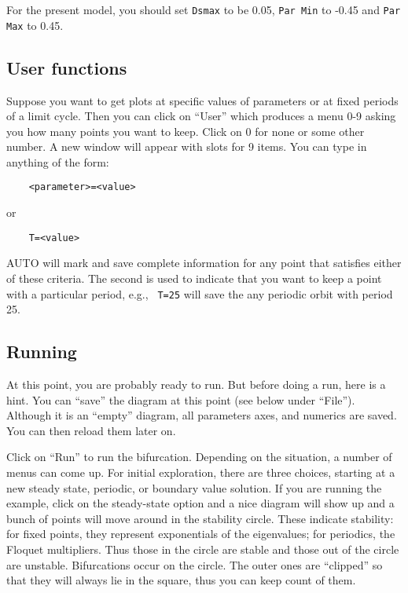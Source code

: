 \documentclass{article}
\begin{document}
For the present model, you should set {\tt Dsmax} to be 0.05, {\tt Par
Min} to -0.45 and {\tt Par Max} to 0.45. 

\subsection{User functions}

Suppose you want to get plots at specific values of parameters or at
fixed periods of a limit cycle.  Then you can click on ``User''
which produces a menu 0-9 asking you how many points you want to keep.
Click on 0 for none or some other number.  A new window will appear
with slots for 9 items.  You can type in anything of the form:
\begin{verbatim}
	<parameter>=<value>
\end{verbatim}
or
\begin{verbatim}
	T=<value>
\end{verbatim}
AUTO will mark and save complete information for any point that
satisfies either of these criteria.  The second is used to indicate
that you want to keep a point with a particular period, e.g., {\tt
T=25} will save the any periodic orbit with period 25.  

\subsection{Running}
At this point, you are probably ready to run.  But before doing a run,
here is a hint.  You can ``save'' the diagram at this point (see below
under ``File'').  Although it is an ``empty'' diagram, all parameters
axes, and numerics are saved.  You can then reload them later on.

Click on ``Run'' to run the bifurcation.  Depending on the situation,
a number of menus can come up.  For initial exploration, there are three
choices, starting at a new steady state, periodic, or boundary value
solution. 
If you are running the
example, click on the steady-state option 
and  a nice diagram will show up and a bunch of points will move
around in the stability circle.  These indicate stability: for fixed
points, they represent exponentials of the eigenvalues; for periodics,
the Floquet multipliers. Thus those in
the circle are stable and those out of the circle are unstable.
Bifurcations occur on the circle. The outer ones are ``clipped'' so
that they will always lie in the square, thus you can keep count of
them.  
\end{document}
